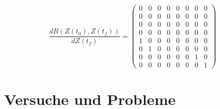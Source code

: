 \begin{itemize}
\begin{equation}
\dfrac{d R(Z(t_0),Z(t_f))}{d Z(t_f)} = \begin{pmatrix}
0 & 0 & 0 & 0 & 0 & 0 & 0 & 0 \\ 
0 & 0 & 0 & 0 & 0 & 0 & 0 & 0 \\ 
0 & 0 & 0 & 0 & 0 & 0 & 0 & 0 \\ 
0 & 0 & 0 & 0 & 0 & 0 & 0 & 0 \\
1 & 0 & 0 & 0 & 0 & 0 & 0 & 0 \\
0 & 1 & 0 & 0 & 0 & 0 & 0 & 0 \\
0 & 0 & 0 & 0 & 0 & 0 & 1 & 0 \\
0 & 0 & 0 & 0 & 0 & 0 & 0 & 1
\end{pmatrix}
\end{equation}
\end{itemize}









\section{Versuche und Probleme}











